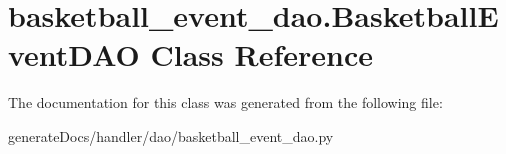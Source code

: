 \hypertarget{classbasketball__event__dao_1_1_basketball_event_d_a_o}{}\section{basketball\+\_\+event\+\_\+dao.\+Basketball\+Event\+D\+AO Class Reference}
\label{classbasketball__event__dao_1_1_basketball_event_d_a_o}


The documentation for this class was generated from the following file\+:\begin{DoxyCompactItemize}
\item 
generate\+Docs/handler/dao/basketball\+\_\+event\+\_\+dao.\+py\end{DoxyCompactItemize}
